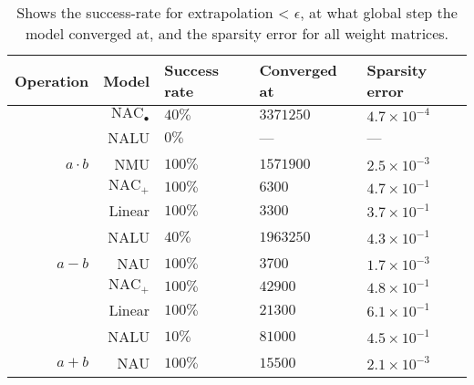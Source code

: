 \begin{table}[H]

\caption{\label{tab:function-task-static-defaults}Shows the success-rate for extrapolation < $\epsilon$, at what global step the model converged at, and the sparsity error for all weight matrices.}
\centering
\begin{tabular}{rrlll}
\toprule
Operation & Model & Success rate & Converged at & Sparsity error\\
\midrule
 & $\mathrm{NAC}_{\bullet}$ & $40\%$ & $3371250$ & \textbf{$4.7 \times 10^{-4}$}\\

 & NALU & $0\%$ & --- & ---\\

\multirow{-3}{*}{\raggedleft\arraybackslash ${a \cdot b}$} & NMU & \textbf{$100\%$} & \textbf{$1571900$} & $2.5 \times 10^{-3}$\\
\cmidrule{1-5}
 & $\mathrm{NAC}_{+}$ & $100\%$ & $6300$ & $4.7 \times 10^{-1}$\\

 & Linear & $100\%$ & $3300$ & $3.7 \times 10^{-1}$\\

 & NALU & $40\%$ & $1963250$ & $4.3 \times 10^{-1}$\\

\multirow{-4}{*}{\raggedleft\arraybackslash $a - b$} & NAU & $100\%$ & $3700$ & $1.7 \times 10^{-3}$\\
\cmidrule{1-5}
 & $\mathrm{NAC}_{+}$ & $100\%$ & $42900$ & $4.8 \times 10^{-1}$\\

 & Linear & $100\%$ & $21300$ & $6.1 \times 10^{-1}$\\

 & NALU & $10\%$ & $81000$ & $4.5 \times 10^{-1}$\\

\multirow{-4}{*}{\raggedleft\arraybackslash $a + b$} & NAU & $100\%$ & $15500$ & $2.1 \times 10^{-3}$\\
\bottomrule
\end{tabular}
\end{table}
